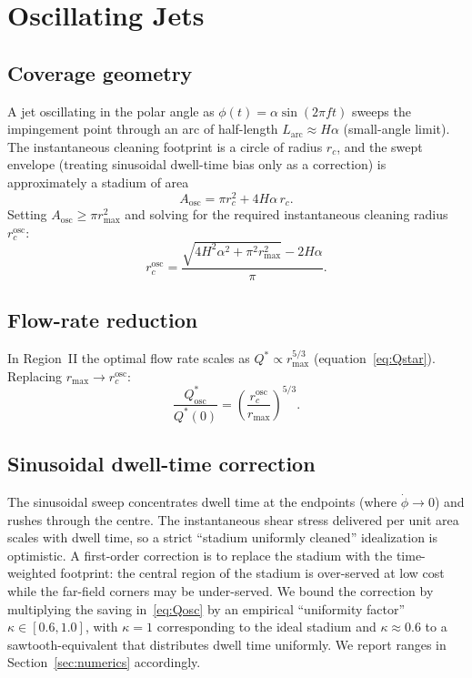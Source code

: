 \documentclass[10pt,letterpaper]{article}
\begin{document}
\section{Oscillating Jets}
\label{sec:oscillating}

\subsection{Coverage geometry}

A jet oscillating in the polar angle as $\phi(t) = \alpha\sin(2\pi f t)$
sweeps the impingement point through an arc of half-length $L_\mathrm{arc}
\approx H\alpha$ (small-angle limit). The instantaneous cleaning footprint
is a circle of radius $r_c$, and the swept envelope (treating sinusoidal
dwell-time bias only as a correction) is approximately a stadium of area
\begin{equation}
  A_\mathrm{osc} = \pi r_c^2 + 4 H \alpha\,r_c.
  \label{eq:Aosc}
\end{equation}
Setting $A_\mathrm{osc} \geq \pi r_\mathrm{max}^2$ and solving for the
required instantaneous cleaning radius $r_c^\mathrm{osc}$:
\begin{equation}
  r_c^\mathrm{osc} =
  \frac{\sqrt{4 H^2 \alpha^2 + \pi^2 r_\mathrm{max}^2} - 2 H\alpha}{\pi}.
  \label{eq:rcosc}
\end{equation}

\subsection{Flow-rate reduction}

In Region~II the optimal flow rate scales as $Q^* \propto r_\mathrm{max}^{5/3}$
(equation~\eqref{eq:Qstar}). Replacing $r_\mathrm{max} \to r_c^\mathrm{osc}$:
\begin{equation}
  \frac{Q^*_\mathrm{osc}}{Q^*(0)} = \left(\frac{r_c^\mathrm{osc}}{r_\mathrm{max}}\right)^{5/3}.
  \label{eq:Qosc}
\end{equation}

\subsection{Sinusoidal dwell-time correction}

The sinusoidal sweep concentrates dwell time at the endpoints (where
$\dot\phi \to 0$) and rushes through the centre. The instantaneous
shear stress delivered per unit area scales with dwell time, so a strict
``stadium uniformly cleaned'' idealization is optimistic. A first-order
correction is to replace the stadium with the time-weighted footprint:
the central region of the stadium is over-served at low cost while the
far-field corners may be under-served. We bound the correction by
multiplying the saving in~\eqref{eq:Qosc} by an empirical
``uniformity factor'' $\kappa \in [0.6, 1.0]$, with $\kappa = 1$
corresponding to the ideal stadium and $\kappa \approx 0.6$ to a
sawtooth-equivalent that distributes dwell time uniformly. We report
ranges in Section~\ref{sec:numerics} accordingly.
\end{document}
